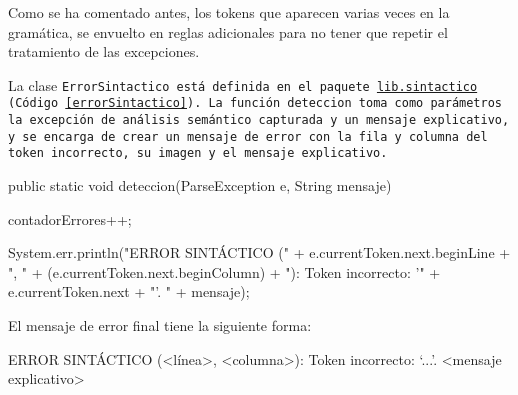 Como se ha comentado antes, los tokens que aparecen varias veces en la gramática, se envuelto en reglas adicionales para no tener que repetir el tratamiento de las excepciones.

La clase \tt{ErrorSintactico} está definida en el paquete \url{lib.sintactico} (Código~\ref{errorSintactico}). La función \tt{deteccion} toma como parámetros la excepción de análisis semántico capturada y un mensaje explicativo, y se encarga de crear un mensaje de error con la fila y columna del token incorrecto, su imagen y el mensaje explicativo.

\begin{codigo}[style=java,caption={Función \url{ErrorSintactico.deteccion}.},label={errorSintactico}]
public static void deteccion(ParseException e, String mensaje) {
    contadorErrores++;

    System.err.println("ERROR SINTÁCTICO (" + e.currentToken.next.beginLine +
            ", " + (e.currentToken.next.beginColumn) + "): Token incorrecto: '" +
            e.currentToken.next + "'. " + mensaje);
}
\end{codigo}

El mensaje de error final tiene la siguiente forma:

\begin{codigo}
ERROR SINTÁCTICO (<línea>, <columna>): Token incorrecto: `...'. <mensaje explicativo>
\end{codigo}
